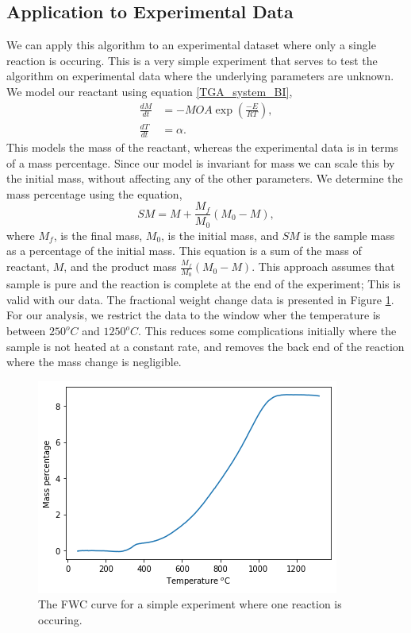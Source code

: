 \subsection{Application to Experimental Data}
\label{Sec:1R_EXP}
We can apply this algorithm to an experimental dataset where only a single reaction is occuring. This is a very simple experiment that serves to test the algorithm on experimental data where the underlying parameters are unknown. We model our reactant using equation \ref{TGA_system_BI},
\begin{align*}
\frac{dM}{dt}&=-MOA\exp\left(\frac{-E}{RT}\right), \\
\frac{dT}{dt}&=\alpha. 
\end{align*}
This models the mass of the reactant, whereas the experimental data is in terms of a mass percentage. Since our model is invariant for mass we can scale this by the initial mass, without affecting any of the other parameters. We determine the mass percentage using the equation,
\begin{equation}
SM=M+\frac{M_f}{M_0}\left(M_0-M\right),
\end{equation}
where $M_f$, is the final mass, $M_0$, is the initial mass, and $SM$ is the sample mass as a percentage of the initial mass. This equation is a sum of the mass of reactant, $M$, and the product mass $\frac{M_f}{M_0}\left(M_0-M\right)$. This approach assumes that sample is pure and the reaction is complete at the end of the experiment; This is valid with our data. The fractional weight change data is presented in Figure \ref{fig:FWC_exp}. For our analysis, we restrict the data to the window wher the temperature is between $250^oC$ and $1250^oC$. This reduces some complications initially where the sample is not heated at a constant rate, and removes the back end of the reaction where the mass change is negligible.\\

\begin{figure}[h!]
\centering
\includegraphics[scale=0.75]{figures/bayesian/1_reaction/EXP/FWC_data.png}
\caption{The FWC curve for a simple experiment where one reaction is occuring.}
\label{fig:FWC_exp}
\end{figure}

